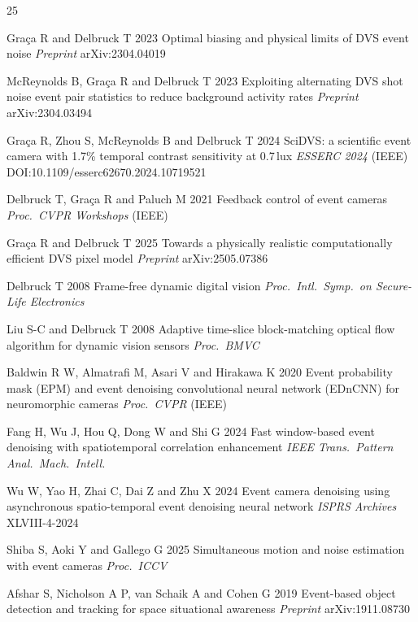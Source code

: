 \documentclass[12pt]{article}
\begin{document}
\begin{thebibliography}{25}

Gra\c{c}a R and Delbruck T 2023
Optimal biasing and physical limits of DVS event noise
\emph{Preprint} arXiv:2304.04019

McReynolds B, Gra\c{c}a R and Delbruck T 2023
Exploiting alternating DVS shot noise event pair statistics to reduce background activity rates
\emph{Preprint} arXiv:2304.03494

Gra\c{c}a R, Zhou S, McReynolds B and Delbruck T 2024
SciDVS: a scientific event camera with 1.7\% temporal contrast sensitivity at 0.7\,lux
\emph{ESSERC 2024} (IEEE) DOI:10.1109/esserc62670.2024.10719521

Delbruck T, Gra\c{c}a R and Paluch M 2021
Feedback control of event cameras
\emph{Proc.\ CVPR Workshops} (IEEE)

Gra\c{c}a R and Delbruck T 2025
Towards a physically realistic computationally efficient DVS pixel model
\emph{Preprint} arXiv:2505.07386

Delbruck T 2008
Frame-free dynamic digital vision
\emph{Proc.\ Intl.\ Symp.\ on Secure-Life Electronics}

Liu S-C and Delbruck T 2008
Adaptive time-slice block-matching optical flow algorithm for dynamic vision sensors
\emph{Proc.\ BMVC}

Baldwin R W, Almatrafi M, Asari V and Hirakawa K 2020
Event probability mask (EPM) and event denoising convolutional neural network (EDnCNN) for neuromorphic cameras
\emph{Proc.\ CVPR} (IEEE)

Fang H, Wu J, Hou Q, Dong W and Shi G 2024
Fast window-based event denoising with spatiotemporal correlation enhancement
\emph{IEEE Trans.\ Pattern Anal.\ Mach.\ Intell.}

Wu W, Yao H, Zhai C, Dai Z and Zhu X 2024
Event camera denoising using asynchronous spatio-temporal event denoising neural network
\emph{ISPRS Archives} XLVIII-4-2024

Shiba S, Aoki Y and Gallego G 2025
Simultaneous motion and noise estimation with event cameras
\emph{Proc.\ ICCV}

Afshar S, Nicholson A P, van Schaik A and Cohen G 2019
Event-based object detection and tracking for space situational awareness
\emph{Preprint} arXiv:1911.08730


\end{thebibliography}
\end{document}
